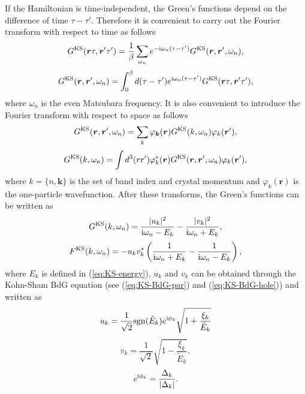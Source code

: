 If the Hamiltonian is time-independent, the
Green's functions depend on the difference of time $\tau - \tau'$. Therefore it is convenient
to carry out the Fourier transform with respect to time as follows
%
\begin{equation}
	G^{\rm KS}(\bm r \tau, \bm r' \tau') = \frac{1}{\beta} \sum_{\omega_n}
	e^{-{\rm i}\omega_n(\tau-\tau')} G^{\rm KS}(\bm r,\bm r', \omega_n),
	\label{eq:GFourier1}
\end{equation}
%
\begin{equation}
	G^{\rm KS}(\bm r, \bm r', \omega_n) = \int_{0}^{\beta} d(\tau-\tau')
	e^{{\rm i}\omega_n(\tau-\tau')} G^{\rm KS}(\bm r \tau,\bm r' \tau'),
	\label{eq:GFourier2}
\end{equation}
%
where $\omega_n$ is the even Matsubara frequency. It is also convenient to introduce the Fourier
transform with respect to space as follows
%
\begin{equation}
	G^{\rm KS}(\bm r, \bm r', \omega_n) = \sum_{ k}\varphi_{\bm k}(\bm r)
	G^{\rm KS}( k, \omega_n)\varphi_{ k}(\bm r'),
\label{eq:GFourier3}
\end{equation}
%
\begin{equation}
	G^{\rm KS}( k, \omega_n) = \int d^3(rr') \varphi^{\ast}_{ k}(\bm r)
	G^{\rm KS}(\bm r,\bm r', \omega_n)
	\varphi_{ k}(\bm r'),
	\label{eq:GFourier4}
\end{equation}
%
where $k=\{ n, \bm k \}$ is the set of band index and crystal momentum and 
$\varphi_{ k}(\bm r)$ is the one-particle wavefunction. After these transforms,
the Green's functions can be written as
%
\begin{equation}
	G^{\rm KS}( k, \omega_n) = \frac{|u_{ k}|^2}{ {\rm i}\omega_n - E_{ k}}
	- \frac{|v_{ k}|^2}{ {\rm i}\omega_n + E_{ k}},
	\label{eq:Gkomega}
\end{equation}
%
\begin{equation}
	F^{\rm KS}( k, \omega_n) = - u_{ k}v_{ k}^{\ast} \left( 
	\frac{1}{ {\rm i}\omega_n + E_{ k}} -\frac{1}{ {\rm i}\omega_n - E_{ k}}
	\right),
	\label{eq:Fkomega}
\end{equation}
%
where $E_{ k} $ is defined in (\ref{eq:KS-energy}), $u_{ k}$ and $v_{ k}$ can be obtained
through the Kohn-Sham BdG equation (see (\ref{eq:KS-BdG-par}) and (\ref{eq:KS-BdG-hole})) 
and written as
%
\begin{equation}
	u_{ k} = \frac{1}{\sqrt{2}} {\rm sgn}(\tilde{E}_{ k})e^{ {\rm i}\phi_{ k}}
	\sqrt{1 + \frac{\xi_{ k}}{\tilde{E}_{ k}}}
	\label{eq:uk}
\end{equation}
%
\begin{equation}
	v_{ k} = \frac{1}{\sqrt{2}} \sqrt{1 - \frac{\xi_{ k}}{\tilde{E}_{ k}}},
	\label{eq:vk}
\end{equation}
%
\begin{equation}
	e^{ {\rm i}\phi_{ k}} = \frac{\Delta_{ k}}{|\Delta_{ k}|}.
	\label{eq:phase}
\end{equation}
%

